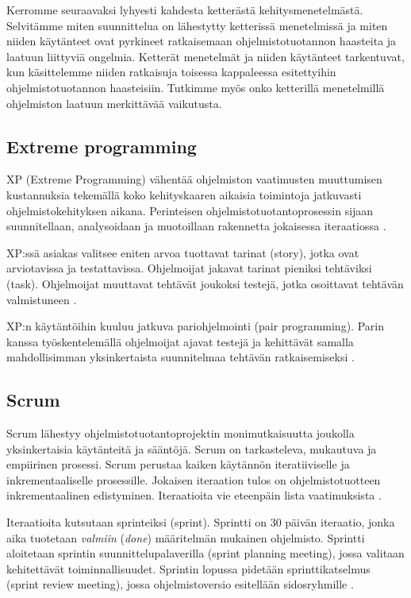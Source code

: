 \documentclass[finnish]{tktltiki2}
\theoremstyle{definition}
\theoremstyle{remark}
\begin{document}
Kerromme seuraavaksi lyhyesti kahdesta ketterästä kehitysmenetelmästä. Selvitämme miten suunnittelua on lähestytty ketterissä menetelmissä ja miten niiden käytänteet ovat pyrkineet ratkaisemaan ohjelmistotuotannon haasteita ja laatuun liittyviä ongelmia. Ketterät menetelmät ja niiden käytänteet tarkentuvat, kun käsittelemme niiden ratkaisuja toisessa kappaleessa esitettyihin ohjelmistotuotannon haasteisiin. Tutkimme myös onko ketterillä menetelmillä ohjelmiston laatuun merkittävää vaikutusta.

\subsection{Extreme programming}

XP (Extreme Programming) vähentää ohjelmiston vaatimusten muuttumisen kustannuksia tekemällä koko kehityskaaren aikaisia toimintoja jatkuvasti ohjelmistokehityksen aikana. Perinteisen ohjelmistotuotantoprosessin sijaan suunnitellaan, analysoidaan ja muotoillaan rakennetta jokaisessa iteraatiossa \cite{BEC99}.

XP:ssä asiakas valitsee eniten arvoa tuottavat tarinat (story), jotka ovat arviotavissa ja testattavissa. Ohjelmoijat jakavat tarinat pieniksi tehtäviksi (task). Ohjelmoijat muuttavat tehtävät joukoksi testejä, jotka osoittavat tehtävän valmistuneen \cite{BEC99}. 

XP:n käytäntöihin kuuluu jatkuva pariohjelmointi (pair programming). Parin kanssa työskentelemällä ohjelmoijat ajavat testejä ja kehittävät samalla mahdollisimman yksinkertaista suunnitelmaa tehtävän ratkaisemiseksi \cite{BEC99}.  

\subsection{Scrum}

Scrum lähestyy ohjelmistotuotantoprojektin monimutkaisuutta joukolla yksinkertaisia käytänteitä ja sääntöjä. Scrum on tarkasteleva, mukautuva ja empiirinen prosessi. Scrum perustaa kaiken käytännön iteratiiviselle ja inkrementaaliselle prosessille. Jokaisen iteraation tulos on ohjelmistotuotteen inkrementaalinen edistyminen. Iteraatioita vie eteenpäin lista vaatimuksista \cite{SCH09}.

Iteraatioita kutsutaan sprinteiksi (sprint). Sprintti on 30 päivän iteraatio, jonka aika tuotetaan \textit{valmiin} (\textit{done}) määritelmän mukainen ohjelmisto. Sprintti aloitetaan sprintin suunnittelupalaverilla (sprint planning meeting), jossa valitaan kehitettävät toiminnallisuudet. Sprintin lopussa pidetään sprinttikatselmus (sprint review meeting), jossa ohjelmistoversio esitellään sidosryhmille \cite{SCH09}.
\end{document}
